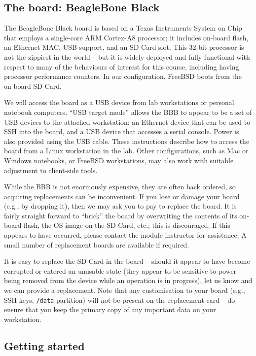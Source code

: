 \documentclass[a4paper,10pt]{article}
\newcommand{\code}[1]{\texttt{\small #1}}
\begin{document}
\subsection*{The board: BeagleBone Black}

The BeagleBone Black board is based on a Texas Instruments System on Chip that
employs a single-core ARM Cortex-A8 processor; it includes on-board flash, an
Ethernet MAC, USB support, and an SD Card slot.
This 32-bit processor is not the zippiest in the world -- but it is widely
deployed and fully functional with respect to many of the behaviours of
interest for this course, including having processor performance counters.
In our configuration, FreeBSD boots from the on-board SD Card.

We will access the board as a USB device from lab workstations or personal
notebook computers.
``USB target mode'' allows the BBB to appear to be a set of USB devices to the
attached workstation: an Ethernet device that can be used to SSH into the
board, and a USB device that accesses a serial console.
Power is also provided using the USB cable.
These instructions describe how to access the board from a Linux workstation
in the lab.
Other configurations, such as Mac or Windows notebooks, or FreeBSD
workstations, may also work with suitable adjustment to client-side tools.

While the BBB is not enormously expensive, they are often back ordered, so
acquiring replacements can be inconvenient.
If you lose or damage your board (e.g., by dropping it), then we may ask you
to pay to replace the board.
It is fairly straight forward to ``brick'' the board by overwriting the
contents of its on-board flash, the OS image on the SD Card, etc.; this is
discouraged.
If this appears to have occurred, please contact the module instructor for
assistance.
A small number of replacement boards are available if required.

It is easy to replace the SD Card in the board -- should it appear to have
become corrupted or entered an unusable state (they appear to be sensitive to
power being removed from the device while an operation is in progress), let us
know and we can provide a replacement.
Note that any customisation to your board (e.g., SSH keys, \code{/data}
partition) will not be present on the replacement card -- do ensure that you
keep the primary copy of any important data on your workstation.

\subsection*{Getting started}
\end{document}
